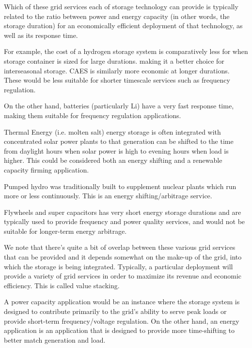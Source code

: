 \documentclass{homework}
\begin{document}
\begin{letterenum}
    Which of these grid services each of storage technology can provide
    is typically related to the ratio between power and energy capacity
    (in other words, the storage duration)
    for an economically efficient deployment of that technology, as well
    as its response time.

    For example, the cost of a hydrogen storage system is
    comparatively less for when storage container is sized for large durations.
    making it a better choice for interseasonal storage. CAES is similarly
    more economic at longer durations. These would be less suitable for
    shorter timescale services such as frequency regulation.

    On the other hand, batteries (particularly Li) have a very fast response time,
    making them suitable for frequency regulation applications.

    Thermal Energy (i.e. molten salt) energy storage is often integrated with
    concentrated solar power plants to that generation can be shifted to the
    time from daylight hours when solar power is high to evening hours
    when load is higher. This could be considered both an energy shifting
    and a renewable capacity firming application.

    Pumped hydro was traditionally built to supplement nuclear plants
    which run more or less continuously. This is an energy shifting/arbitrage
    service. 

    Flywheels and super capacitors has very short energy storage durations and 
    are typically used to provide frequency and power quality services, and
    would not be suitable for longer-term energy arbitrage.

    We note that there's quite a bit of overlap between these various grid
    services that can be provided and it depends somewhat on the make-up
    of the grid, into which the storage is being integrated. Typically,
    a particular deployment will provide a variety of grid services
    in order to maximize its revenue and economic efficiency. This is called value
    stacking.

\item A power capacity application would be an instance where the storage
    system is designed to contribute primarily to the grid's ability to serve
    peak loads or provide short-term frequency/voltage regulation. On the
    other hand, an energy application is an application that is designed to
    provide more time-shifting to better match generation and load.
    

\end{letterenum}
\end{document}
